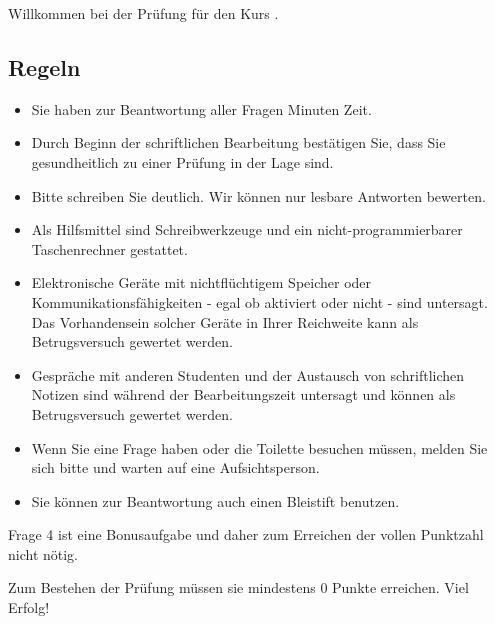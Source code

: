 






Willkommen bei der Prüfung für den Kurs {\textbf \coursename}.

\subsection*{Regeln}

\begin{itemize}
\item Sie haben zur Beantwortung aller Fragen \examlength\xspace Minuten Zeit.
\item Durch Beginn der schriftlichen Bearbeitung bestätigen Sie, dass Sie gesundheitlich zu einer Prüfung in der Lage sind.
\item Bitte schreiben Sie deutlich. Wir können nur lesbare Antworten bewerten.
\item Als Hilfsmittel sind Schreibwerkzeuge und ein nicht-programmierbarer Taschenrechner gestattet.
\item Elektronische Geräte mit nichtflüchtigem Speicher oder Kommunikationsfähigkeiten - egal ob aktiviert oder nicht - sind untersagt. Das Vorhandensein solcher Geräte in Ihrer Reichweite kann als Betrugsversuch gewertet werden.
\item Gespräche mit anderen Studenten und der Austausch von schriftlichen Notizen sind während der Bearbeitungszeit untersagt und können als Betrugsversuch gewertet werden.
\item Wenn Sie eine Frage haben oder die Toilette besuchen müssen, melden Sie sich bitte und warten auf eine Aufsichtsperson.
\item Sie können zur Beantwortung auch einen Bleistift benutzen.
\end{itemize}

Frage 4 ist eine Bonusaufgabe und daher zum Erreichen der vollen Punktzahl nicht nötig.

Zum Bestehen der Prüfung müssen sie mindestens 0 Punkte erreichen. Viel Erfolg!
\\\\
\begin{center}
\combinedgradetable[h]
\end{center}
\pagebreak

\begin{questions}




\end{questions}

